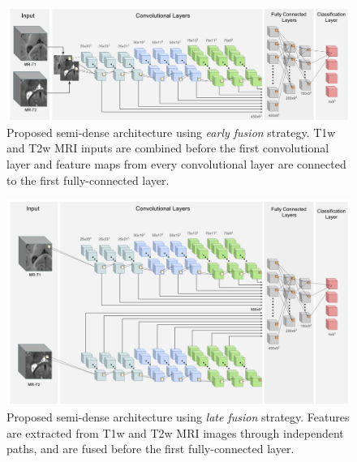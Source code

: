 \documentclass[twoside,espcrc2]{elsarticle}
\newcommand{\vold}[1]{$#1\!\times\!#1\!\times\!#1$}
\begin{document}

\begin{figure}[ht!]
\centering
\begin{center} 
        \includegraphics[width=1.02\textwidth]{CNNTest2.png}
\caption{Proposed semi-dense architecture using \textit{early fusion} strategy. T1w and T2w MRI inputs are combined before the first convolutional layer and feature maps from every convolutional layer are connected to the first fully-connected layer.}
\label{fig:CNN_archit_Early}
\end{center}        
\end{figure}

\begin{figure}[ht!]
\centering
\begin{center} 
        \includegraphics[width=1.02\textwidth]{SemiDenseNET.png}
\caption{Proposed semi-dense architecture using \textit{late fusion} strategy. Features are extracted from T1w and T2w MRI images through independent paths, and are fused before the first fully-connected layer.}
\label{fig:CNN_archit_Late}
\end{center}        
\end{figure}
\end{document}
